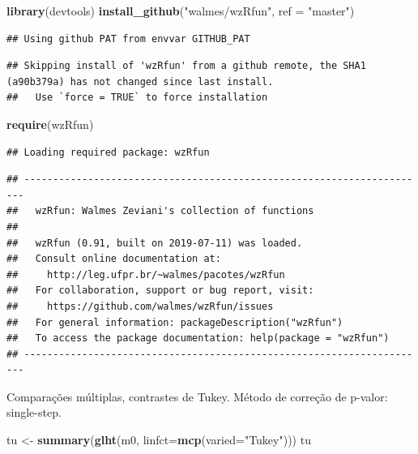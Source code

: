 \documentclass[
]{book}
\newenvironment{Shaded}{\begin{snugshade}}{\end{snugshade}}
\newcommand{\DataTypeTok}[1]{\textcolor[rgb]{0.13,0.29,0.53}{#1}}
\newcommand{\KeywordTok}[1]{\textcolor[rgb]{0.13,0.29,0.53}{\textbf{#1}}}
\newcommand{\NormalTok}[1]{#1}
\newcommand{\StringTok}[1]{\textcolor[rgb]{0.31,0.60,0.02}{#1}}
\begin{document}
\begin{Shaded}
\begin{Highlighting}[]
\KeywordTok{library}\NormalTok{(devtools) }
\KeywordTok{install_github}\NormalTok{(}\StringTok{"walmes/wzRfun"}\NormalTok{, }\DataTypeTok{ref =} \StringTok{"master"}\NormalTok{) }
\end{Highlighting}
\end{Shaded}

\begin{verbatim}
## Using github PAT from envvar GITHUB_PAT
\end{verbatim}

\begin{verbatim}
## Skipping install of 'wzRfun' from a github remote, the SHA1 (a90b379a) has not changed since last install.
##   Use `force = TRUE` to force installation
\end{verbatim}

\begin{Shaded}
\begin{Highlighting}[]
\KeywordTok{require}\NormalTok{(wzRfun)}
\end{Highlighting}
\end{Shaded}

\begin{verbatim}
## Loading required package: wzRfun
\end{verbatim}

\begin{verbatim}
## ----------------------------------------------------------------------
##   wzRfun: Walmes Zeviani's collection of functions
## 
##   wzRfun (0.91, built on 2019-07-11) was loaded.
##   Consult online documentation at:
##     http://leg.ufpr.br/~walmes/pacotes/wzRfun
##   For collaboration, support or bug report, visit:
##     https://github.com/walmes/wzRfun/issues
##   For general information: packageDescription("wzRfun")
##   To access the package documentation: help(package = "wzRfun")
## ----------------------------------------------------------------------
\end{verbatim}

Comparações múltiplas, contrastes de Tukey. Método de correção de p-valor: single-step.

\begin{Shaded}
\begin{Highlighting}[]
\NormalTok{tu <-}\StringTok{ }\KeywordTok{summary}\NormalTok{(}\KeywordTok{glht}\NormalTok{(m0, }\DataTypeTok{linfct=}\KeywordTok{mcp}\NormalTok{(}\DataTypeTok{varied=}\StringTok{"Tukey"}\NormalTok{))) }
\NormalTok{tu}
\end{Highlighting}
\end{Shaded}
\end{document}
